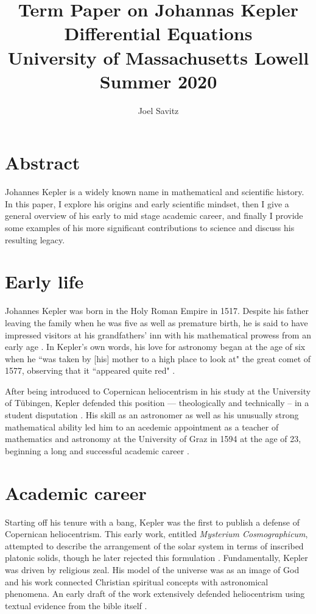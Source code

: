 \documentclass[11pt]{article}
\title{Term Paper on Johannas Kepler \\
\small Differential Equations \\
University of Massachusetts Lowell \\
Summer 2020}
\author{Joel Savitz}
\begin{document}
\maketitle

\section{Abstract}

Johannes Kepler is a widely known name
in mathematical and scientific history.
In this paper, I explore his origins
and early scientific mindset,
then I give a general overview of
his early to mid stage academic career,
and finally I provide some examples
of his more significant contributions
to science and discuss his resulting legacy.

\section{Early life}

Johannes Kepler was born in the Holy Roman Empire in 1517.
Despite his father leaving the family when he was five
as well as premature birth, 
he is said to have impressed visitors at his
grandfathers' inn with his mathematical prowess
from an early age \cite{caspar}.
In Kepler's own words,
his love for astronomy began at the age of six
when he ``was taken by [his] mother to a high place to look at"
the great comet of 1577, observing that
it ``appeared quite red" \cite{koestler}.


After being introduced to Copernican heliocentrism
in his study at the University of Tübingen,
Kepler defended this position
--- theologically and technically --
in a student disputation \cite{westman}.
His skill as an astronomer as well as
his unusually strong mathematical ability
led him to an acedemic appointment
as a teacher of mathematics and astronomy
at the University of Graz in 1594
at the age of 23,
beginning a long and successful academic career \cite{caspar}.

\section{Academic career}

Starting off his tenure with a bang,
Kepler was the first to publish a defense
of Copernican heliocentrism.
This early work,
entitled \textit{Mysterium Cosmographicum},
attempted to describe
the arrangement of the solar system
in terms of inscribed platonic solids,
though he later rejected this formulation \cite{caspar}.
Fundamentally, Kepler was driven by religious zeal.
His model of the universe was as an image of God
and his work connected Christian spiritual concepts
with astronomical phenomena.
An early draft of the work
extensively defended heliocentrism
using textual evidence from the bible itself \cite{barker}.
\end{document}
